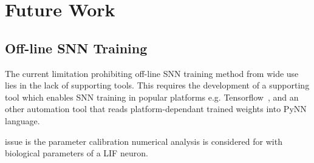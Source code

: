 %



\section{Future Work}
\subsection{Off-line SNN Training}
The current limitation prohibiting \DIFdelbegin {}\DIFdelend \DIFaddbegin {}\DIFaddend off-line SNN training method from \DIFaddbegin {}\DIFaddend wide use lies in the lack of supporting tools.
This requires the development of a supporting tool which enables SNN training in popular \DIFdelbegin {}\DIFdelend \DIFaddbegin {}\DIFaddend platforms e.g. Tensorflow~\citep{tensorflow2015-whitepaper}, and an other automation tool that reads platform-dependant trained weights into \DIFaddbegin {}\DIFaddend PyNN~\citep{davison2008pynn} language.

\DIFdelbegin {}\DIFdelend \DIFaddbegin {}\DIFaddend issue is the parameter calibration \DIFdelbegin {}\DIFdelend \DIFaddbegin {}\DIFaddend numerical analysis is considered for \DIFdelbegin {}\DIFdelend \DIFaddbegin {}\DIFaddend with biological parameters of a LIF neuron.

